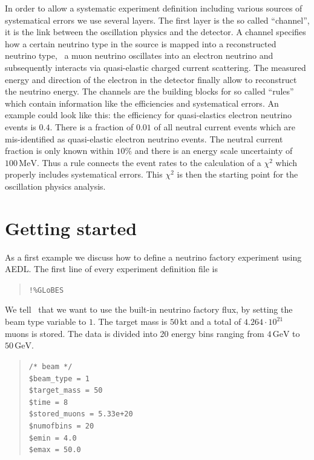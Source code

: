 In order to allow a systematic experiment definition including various
sources of systematical errors we use several layers. The first layer is
the so called ``channel'', it is the link between the oscillation physics
and the detector. A channel specifies how a certain neutrino type in the 
source is mapped into a reconstructed neutrino type, \eg\ a muon neutrino
oscillates into an electron neutrino and subsequently interacts via
quasi-elastic charged current scattering. The measured energy and direction of
the electron in the detector finally allow to reconstruct the neutrino energy.
The channels are the building blocks for so called ``rules'' which
contain information like the efficiencies and systematical errors. An example
could look like this: the efficiency for quasi-elastics electron neutrino
events is $0.4$. There is a fraction of $0.01$ of all neutral current events
which are mis-identified as quasi-elastic electron neutrino events. 
The neutral current fraction is only known within $10\%$ and there is
an energy scale uncertainty of $100\,\mathrm{MeV}$. Thus a rule connects the
event rates to the calculation of a $\chi^2$ which properly includes 
systematical errors. This $\chi^2$ is then the starting point for the
oscillation physics analysis.

\chapter{Getting started}

As a first example we discuss how to define a neutrino factory experiment using
AEDL. The first line of every experiment definition file is
\begin{quote}
{\tt !\%GLoBES}
\end{quote}

We tell \GLOBES\ that we want to use the built-in neutrino factory
flux, by setting the beam type variable to $1$. The target mass 
is $50\,\mathrm{kt}$ and a total of $ 4.264\cdot10^{21}$
muons is stored. The data is divided into 20 energy bins ranging from
$4\,\mathrm{GeV}$ to $50\,\mathrm{GeV}$. 
\begin{quote}
{\tt /* beam */}\\
{\tt \$beam\_type = 1}\\
{\tt \$target\_mass = 50}\\
{\tt \$time = 8}\\
{\tt \$stored\_muons = 5.33e+20}\\
{\tt \$numofbins = 20}\\
{\tt \$emin = 4.0}\\
{\tt \$emax = 50.0}
\end{quote}


